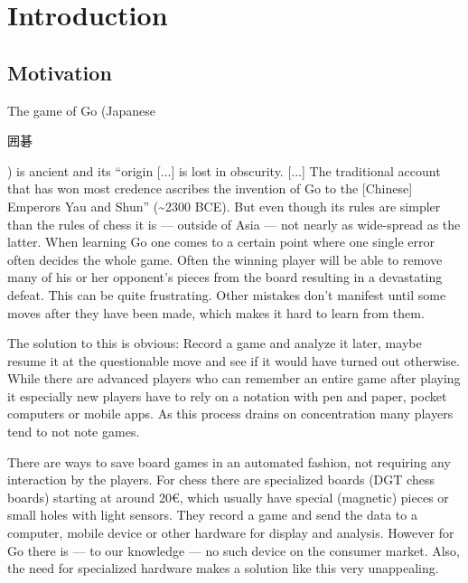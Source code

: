 
\chapter{Introduction}
	\section{Motivation}
	\label{introduction-motivation}
	The game of Go (Japanese \begingroup\setmainfont{Droid Sans Japanese}\small\begin{CJK}{UTF8}{min}囲碁\end{CJK}\endgroup ) is ancient and its ``origin [...] is lost in obscurity. [...] The traditional account that has won most credence ascribes the invention of Go to the [Chinese] Emperors Yau and Shun'' \cite{mihori1939japanese} (\textasciitilde 2300 BCE). But even though its rules are simpler than the rules of chess it is --- outside of Asia --- not nearly as wide-spread as the latter. When learning Go one comes to a certain point where one single error often decides the whole game. Often the winning player will be able to remove many of his or her opponent's pieces from the board resulting in a devastating defeat. This can be quite frustrating. Other mistakes don't manifest until some moves after they have been made, which makes it hard to learn from them.

	The solution to this is obvious: Record a game and analyze it later, maybe resume it at the questionable move and see if it would have turned out otherwise. While there are advanced players who can remember an entire game after playing it especially new players have to rely on a notation with pen and paper, pocket computers or mobile apps. As this process drains on concentration many players tend to not note games.

	There are ways to save board games in an automated fashion, not requiring any interaction by the players. For chess there are specialized boards (DGT chess boards) starting at around 20€, which usually have special (magnetic) pieces \cite{bulsink2001device} or small holes with light sensors. They record a game and send the data to a computer, mobile device or other hardware for display and analysis. However for Go there is --- to our knowledge --- no such device on the consumer market. Also, the need for specialized hardware makes a solution like this very unappealing.

